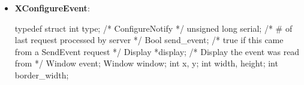 \documentclass{report}
\begin{document}
\begin{itemize}
\begin{itemize}
                \item actual\_type\_return Returns the atom identifier that defines the actual type of the property.
                \item actual\_format\_return Returns the actual format of the property.
                \item nitems\_return Returns the actual number of 8-bit, 16-bit, or 32-bit items stored in the prop\_return data.
                \item bytes\_after\_return Returns the number of bytes remaining to be read in the property if a partial read was performed.
                \item prop\_return Returns the data in the specified format.
            \end{itemize}
            \begin{itemize}
                \item \textbf{Possible errors}:
                    \begin{itemize}
                        \item \textbf{BadAtom}
                        \item \textbf{BadValue}
                        \item \textbf{BadWindow}
                    \end{itemize}
                \item \textbf{Return identifiers}:
                    \begin{itemize}
                        \item \textbf{Success}: Nonzero
                        \item \textbf{Failure}: Zero
                    \end{itemize}
            \end{itemize}
        \item \textbf{XConfigureEvent}:
            \bigbreak \noindent 
            \begin{cppcode}
                typedef struct {
                    int type;               /* ConfigureNotify */
                    unsigned long serial;   /* # of last request processed by server */
                    Bool send_event;        /* true if this came from a SendEvent request */
                    Display *display;       /* Display the event was read from */
                    Window event;
                    Window window;
                    int x, y;
                    int width, height;
                    int border_width;
}
\end{cppcode}
\end{itemize}
\end{document}
